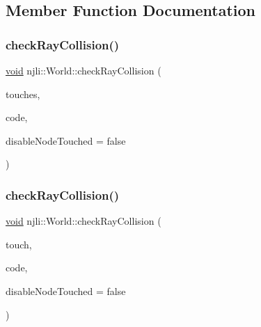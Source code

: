 \subsection{Member Function Documentation}
\mbox{\label{classnjli_1_1_world_a9e884bc811dcdf6821f2d5a2edccf669}} 
\subsubsection{\texorpdfstring{check\+Ray\+Collision()}{checkRayCollision()}\hspace{0.1cm}{\footnotesize\ttfamily [1/3]}}
{\footnotesize\ttfamily \mbox{\hyperlink{_thread_8h_af1e856da2e658414cb2456cb6f7ebc66}{void}} njli\+::\+World\+::check\+Ray\+Collision (\begin{DoxyParamCaption}\item[{\mbox{\hyperlink{classnjli_1_1_device_touch}{Device\+Touch}} $\ast$$\ast$}]{touches,  }\item[{const char $\ast$}]{code,  }\item[{bool}]{disable\+Node\+Touched = {\ttfamily false} }\end{DoxyParamCaption})\hspace{0.3cm}{\ttfamily [protected]}}

\mbox{\label{classnjli_1_1_world_a3e3cfdf16d875d3fc64c7428c07d23d7}} 
\subsubsection{\texorpdfstring{check\+Ray\+Collision()}{checkRayCollision()}\hspace{0.1cm}{\footnotesize\ttfamily [2/3]}}
{\footnotesize\ttfamily \mbox{\hyperlink{_thread_8h_af1e856da2e658414cb2456cb6f7ebc66}{void}} njli\+::\+World\+::check\+Ray\+Collision (\begin{DoxyParamCaption}\item[{const \mbox{\hyperlink{classnjli_1_1_device_touch}{Device\+Touch}} \&}]{touch,  }\item[{const char $\ast$}]{code,  }\item[{bool}]{disable\+Node\+Touched = {\ttfamily false} }\end{DoxyParamCaption})\hspace{0.3cm}{\ttfamily [protected]}}

